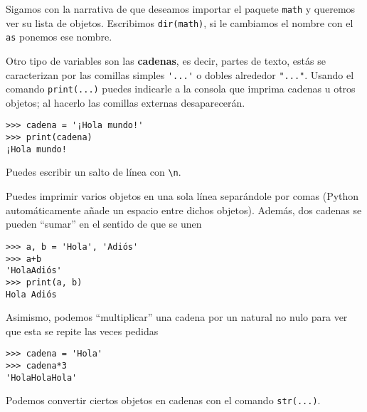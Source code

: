 \documentclass[11pt,twoside]{report}
\begin{document}
Sigamos con la narrativa de que deseamos importar el paquete \lstinline|math| y queremos ver su lista de objetos. Escribimos \lstinline|dir(math)|, si le cambiamos el nombre con el \lstinline|as| ponemos ese nombre.

Otro tipo de variables son las \textbf{cadenas}, es decir, partes de texto, estás se caracterizan por las comillas simples \lstinline|'...'| o dobles alrededor \lstinline|"..."|. Usando el comando \lstinline|print(...)| puedes indicarle a la consola que imprima cadenas u otros objetos; al hacerlo las comillas externas desaparecerán.
\begin{lstlisting}
>>> cadena = '¡Hola mundo!'
>>> print(cadena)
¡Hola mundo!
\end{lstlisting}
Puedes escribir un salto de línea con \lstinline|\n|.

Puedes imprimir varios objetos en una sola línea separándole por comas (Python automáticamente añade un espacio entre dichos objetos). Además, dos cadenas se pueden ``sumar'' en el sentido de que se unen
\begin{lstlisting}
>>> a, b = 'Hola', 'Adiós'
>>> a+b
'HolaAdiós'
>>> print(a, b)
Hola Adiós
\end{lstlisting}
Asimismo, podemos ``multiplicar'' una cadena por un natural no nulo para ver que esta se repite las veces pedidas
\begin{lstlisting}
>>> cadena = 'Hola'
>>> cadena*3
'HolaHolaHola'
\end{lstlisting}
Podemos convertir ciertos objetos en cadenas con el comando \lstinline|str(...)|.
\end{document}
